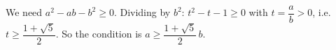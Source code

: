 We need $a^2-ab-b^2\ge0$. Dividing by $b^2$: $t^2-t-1\ge0$ with $t=\dfrac ab>0$, i.e. $t\ge\dfrac{1+\sqrt5}{2}$. So the condition is $\boxed{a\ge\dfrac{1+\sqrt5}{2}\,b}$.
